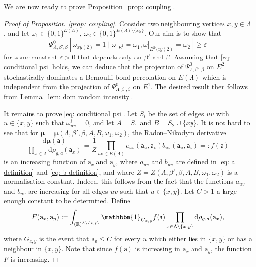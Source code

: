\documentclass[11pt,a4paper]{article}
\theoremstyle{definition}
\numberwithin{equation}{section}
\begin{document}
We are now ready to prove Proposition~\ref{prop: coupling}.
\begin{proof}[Proof of Proposition~\textup{\ref{prop: coupling}}]
Consider two neighbouring vertices $x,y\in \Lambda$, and let $\omega_1\in \{0,1\}^{E(\Lambda)}$, $\omega_2 \in \{0,1\}^{E(\Lambda)\setminus\{xy\}}$. Our aim is to show that 
\begin{equation}\label{eq: conditional psi}
\Psi^0_{\Lambda,\beta',\beta}[\omega_{xy(2)}=1 \mid \omega|_{E^1}=\omega_1, \omega|_{E^2\setminus xy(2)}=\omega_2]\geq \varepsilon
\end{equation}
for some constant $\varepsilon>0$ that depends only on $\beta'$ and $\beta$. Assuming that \eqref{eq: conditional psi} holds, we can deduce that the projection of $\Psi^0_{\Lambda,\beta',\beta}$ on $E^2$ stochastically dominates a Bernoulli bond percolation on $E(\Lambda)$ which is independent from the projection of $\Psi^0_{\Lambda,\beta',\beta}$ on $E^1$. The desired result then follows from Lemma~\ref{lem: dom random intensity}.

It remains to prove \eqref{eq: conditional psi}.
Let $S_i$ be the set of edges $uv$ with $u\in \{x,y\}$ such that $\omega^i_{uv}=0$, and let $A=S_1$ and $B=S_2\cup\{xy\}$. 
It is not hard to see that for $\boldsymbol{\mu}=\boldsymbol{\mu}(\Lambda,\beta',\beta,A,B,\omega_1,\omega_2)$, the Radon--Nikodym derivative
\begin{equation}\label{eq:density increasing formula}
\frac{\mathrm{d}\boldsymbol{\mu}(\mathsf{a})}{\prod_{x\in \Lambda}\mathrm{d}\rho_{g,a}(\mathsf{a}_x)} =\frac{1}{Z} \prod_{uv\in E(\Lambda)} a_{uv}(\mathsf{a}_u,\mathsf{a}_v)b_{uv}(\mathsf{a}_u,\mathsf{a}_v)=:f(\mathsf{a})  
\end{equation} 
is an increasing function of $\mathsf{a}_x$ and $\mathsf{a}_y$, where $a_{uv}$ and $b_{uv}$ are defined in \eqref{eq: a definition} and \eqref{eq: b definition}, and where $Z=Z(\Lambda,\beta',\beta,A,B,\omega_1,\omega_2)$ is a normalisation constant. Indeed, this follows from the fact that the functions $a_{uv}$ and $b_{uv}$ are increasing for all edges $uv$ such that $u\in \{x,y\}$. Let $C>1$ a large enough constant to be determined. Define
\begin{equation}
F(\mathsf{a}_x,\mathsf{a}_y):=\int_{(\mathbb R)^{\Lambda\setminus \{x,y\}}}\mathbbm{1}_{G_{x,y}}f(\mathsf{a})\prod_{x\in \Lambda\setminus \{x,y\}}\mathrm{d}\rho_{g,a}(\mathsf{a}_x),
\end{equation}
where $G_{x,y}$ is the event that $\mathsf{a}_u\leq C$ for every $u$ which either lies in $\{x,y\}$ or has a neighbour in $\{x,y\}$. Note that since $f(\mathsf{a})$ is increasing in $\mathsf{a}_x$ and $\mathsf{a}_y$, the function $F$ is increasing.


\end{proof}
\end{document}
